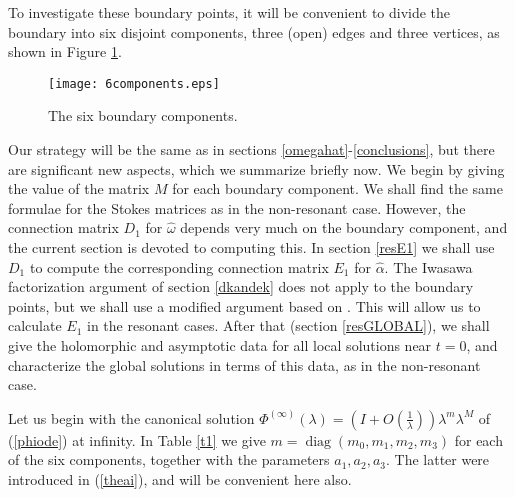 \documentclass[a4paper,12pt,leqno]{amsart}
\numberwithin{equation}{section}
\theoremstyle{plain}
\theoremstyle{definition}
\newcommand{\al}{\alpha}
\newcommand{\la}{\lambda}
\newcommand{\om}{\omega}
\DeclareMathOperator{\diag}{diag}
\newcommand{\Phii}{\Phi^{(\infty)}}
\newcommand{\nn}{m}
\newcommand{\NN}{M}
\begin{document}
{To investigate these boundary points, it will be convenient to divide the boundary into six disjoint components,  three (open) edges and three vertices, as shown in Figure \ref{6components}.  

\begin{figure}[h]
\begin{center}
\texttt{[image: 6components.eps]}
\end{center}
\caption{The six boundary components.}\label{6components}
\end{figure}

Our strategy will be the same as in sections \ref{omegahat}-\ref{conclusions},
but there are significant new aspects, which we summarize briefly now.  We begin by giving the value of the matrix $\NN$ for each boundary component.  We shall find the same formulae for the Stokes matrices as in the non-resonant case.
However, the connection matrix $D_1$ for $\hat\om$ depends very much on the boundary component, and the current section is devoted to computing this.
In section \ref{resE1} we shall use $D_1$ to compute the corresponding connection matrix $E_1$ for $\hat\al$.  
The Iwasawa factorization argument of section \ref{dkandek} does not apply to the boundary points,  but we shall use a modified argument based on \cite{DoGuRo10}.  This will allow us to calculate $E_1$ in the resonant cases. 
After that (section \ref{resGLOBAL}), we shall give the holomorphic and asymptotic data for all local solutions near $t=0$, and characterize the global solutions in terms of this data, as in the non-resonant case. 

Let us begin with the canonical solution $\Phii(\la)=\left(I+O(\tfrac1\la)\right)\la^\nn\la^\NN$ of (\ref{phiode}) at infinity.
In Table \ref{t1} we give $\nn=\diag(\nn_0,\nn_1,\nn_2,\nn_3)$  for each of the six components, together with the parameters $a_1,a_2,a_3$.  The latter were introduced in (\ref{theai}), and will be convenient here also.

}
\end{document}
